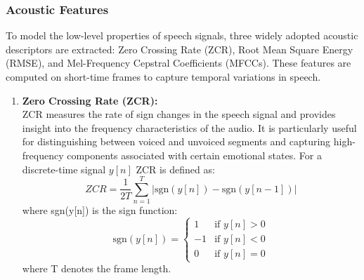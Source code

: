 \documentclass[iicol,sn-mathphys-num]{sn-jnl}%
\theoremstyle{thmstyleone}%
\theoremstyle{thmstyletwo}%
\theoremstyle{thmstylethree}%
\begin{document}
\subsubsection{Acoustic Features}\label{subsubsec3.3.1}
 To model the low-level properties of speech signals, three widely adopted acoustic descriptors are extracted: Zero Crossing Rate (ZCR), Root Mean Square Energy (RMSE), and Mel-Frequency Cepstral Coefficients (MFCCs). These features are computed on short-time frames to capture temporal variations in speech.
 
\begin{enumerate}

    \item \textbf{Zero Crossing Rate (ZCR):}\\
  ZCR measures the rate of sign changes in the speech signal and provides insight into the frequency characteristics of the audio. It is particularly useful for distinguishing between voiced and unvoiced segments and capturing high-frequency components associated with certain emotional states. For a discrete-time signal 
 $y[n]$ ZCR is defined as:
  \begin{equation}
    ZCR = \frac{1}{2T} \sum_{n=1}^{T} |\text{sgn}(y[n]) - \text{sgn}(y[n-1])|
    \end{equation}
    where sgn(y[n]) is the sign function:
    \begin{equation}
    \text{sgn}(y[n]) =
    \begin{cases}
        1 & \text{if } y[n] > 0 \\
        -1 & \text{if } y[n] < 0 \\
        0 & \text{if } y[n] = 0
    \end{cases}
    \end{equation}
    where T denotes the frame length.
    
    
    

\end{enumerate}
\end{document}
